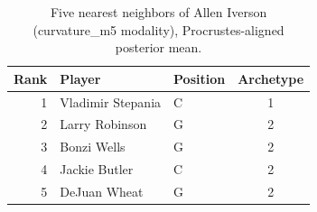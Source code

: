 \begin{table}[htbp]
  \centering\small
  \begin{tabular}{rllc}
    \toprule
    Rank & Player & Position & Archetype \\
    \midrule
    1 & Vladimir Stepania & C & 1 \\
    2 & Larry Robinson & G & 2 \\
    3 & Bonzi Wells & G & 2 \\
    4 & Jackie Butler & C & 2 \\
    5 & DeJuan Wheat & G & 2 \\
    \bottomrule
  \end{tabular}
  \caption{Five nearest neighbors of Allen Iverson (curvature_m5 modality), Procrustes-aligned posterior mean.}
  \label{tab:Allen_Iverson_neighbors_curvature_m5}
\end{table}

